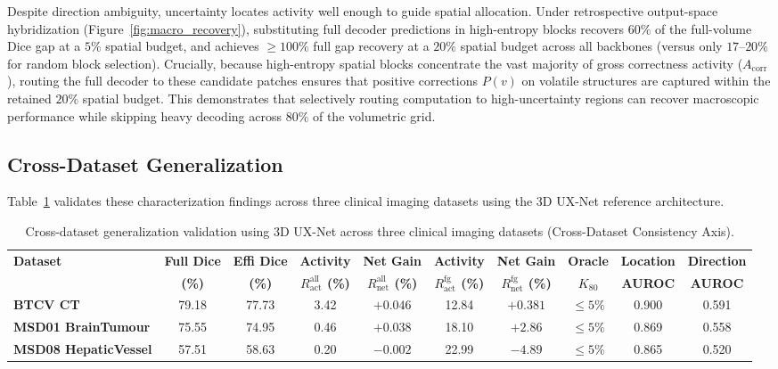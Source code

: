 Despite direction ambiguity, uncertainty locates activity well enough to guide spatial allocation. Under retrospective output-space hybridization (Figure~\ref{fig:macro_recovery}), substituting full decoder predictions in high-entropy blocks recovers $60\%$ of the full-volume Dice gap at a $5\%$ spatial budget, and achieves $\ge 100\%$ full gap recovery at a $20\%$ spatial budget across all backbones (versus only $17\text{--}20\%$ for random block selection). Crucially, because high-entropy spatial blocks concentrate the vast majority of gross correctness activity ($A_{\text{corr}}$), routing the full decoder to these candidate patches ensures that positive corrections $P(v)$ on volatile structures are captured within the retained $20\%$ spatial budget. This demonstrates that selectively routing computation to high-uncertainty regions can recover macroscopic performance while skipping heavy decoding across $80\%$ of the volumetric grid.

\subsection{Cross-Dataset Generalization}
\label{sec:results_generalization}

Table~\ref{tab:cross_dataset} validates these characterization findings across three clinical imaging datasets using the 3D UX-Net reference architecture.

\begin{table}[t]
\centering
\caption{Cross-dataset generalization validation using 3D UX-Net across three clinical imaging datasets (Cross-Dataset Consistency Axis).}
\label{tab:cross_dataset}
\footnotesize
\begin{tabular*}{\textwidth}{@{\extracolsep{\fill}}lccccccccc}
\toprule
\textbf{Dataset} & \textbf{Full Dice} & \textbf{Effi Dice} & \textbf{Activity} & \textbf{Net Gain} & \textbf{Activity} & \textbf{Net Gain} & \textbf{Oracle} & \textbf{Location} & \textbf{Direction} \\
 & \textbf{(\%)} & \textbf{(\%)} & \textbf{$R_{\text{act}}^{\text{all}}$ (\%)} & \textbf{$R_{\text{net}}^{\text{all}}$ (\%)} & \textbf{$R_{\text{act}}^{\text{fg}}$ (\%)} & \textbf{$R_{\text{net}}^{\text{fg}}$ (\%)} & \textbf{$K_{80}$} & \textbf{AUROC} & \textbf{AUROC} \\
\midrule
\textbf{BTCV CT} & 79.18 & 77.73 & 3.42 & $+0.046$ & 12.84 & $+0.381$ & $\le 5\%$ & 0.900 & 0.591 \\
\textbf{MSD01 BrainTumour} & 75.55 & 74.95 & 0.46 & $+0.038$ & 18.10 & $+2.86$ & $\le 5\%$ & 0.869 & 0.558 \\
\textbf{MSD08 HepaticVessel} & 57.51 & 58.63 & 0.20 & $-0.002$ & 22.99 & $-4.89$ & $\le 5\%$ & 0.865 & 0.520 \\
\bottomrule
\end{tabular*}
\end{table}

